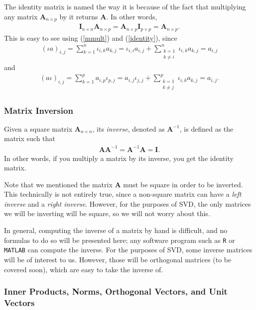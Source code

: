 \documentclass[10pt]{article}
\newcommand{\mydef}[1]{\textcolor{SteelBlue3}{\textit{#1}}} %
\begin{document}
The identity matrix is named the way it is because of the fact that multiplying any matrix $\mathbf{A}_{n \times p}$ by it returns $\mathbf{A}$. In other words, 
\begin{align}
    \mathbf{I}_{n \times n} \mathbf{A}_{n \times p} = \mathbf{A}_{n \times p} \mathbf{I}_{p \times p} = \mathbf{A}_{n \times p}.
\end{align}
This is easy to see using (\ref{mmult}) and (\ref{identity}), since
\begin{align*}
    (\iota a)_{i,j} = \sum_{k=1}^n \iota_{i,k} a_{k,j} = \iota_{i,i} a_{i,j} + \sum_{\substack{k=1\\k\not=i}}^n \iota_{i,k} a_{k,j} = a_{i,j}
\end{align*}
and 
\begin{align*}
    (a\iota)_{i,j} = \sum_{k=1}^p a_{i,p} \iota_{p,j} = a_{i,j} \iota_{j,j} + \sum_{\substack{k=1\\k\not=j}}^p \iota_{i,k} a_{k,j} = a_{i,j}.
\end{align*}

\subsubsection{Matrix Inversion}

Given a square matrix $\mathbf{A}_{n \times n}$, its \mydef{inverse}, denoted as $\mathbf{A}^{-1}$, is defined as the matrix such that 
\begin{align}
    \label{inverse}
    \mathbf{A} \mathbf{A}^{-1} = \mathbf{A}^{-1} \mathbf{A} = \mathbf{I}.
\end{align}
In other words, if you multiply a matrix by its inverse, you get the identity matrix.

Note that we mentioned the matrix $\mathbf{A}$ must be square in order to be inverted. This technically is not entirely true, since a non-square matrix can have a \mydef{left inverse} and a \mydef{right inverse}. However, for the purposes of SVD, the only matrices we will be inverting will be square, so we will not worry about this. 

In general, computing the inverse of a matrix by hand is difficult, and no formulas to do so will be presented here; any software program such as \texttt{R} or \texttt{MATLAB} can compute the inverse. For the purposes of SVD, some inverse matrices will be of interest to us. However, those will be orthogonal matrices (to be covered soon), which are easy to take the inverse of. 

\subsubsection{Inner Products, Norms, Orthogonal Vectors, and Unit Vectors}
\end{document}
